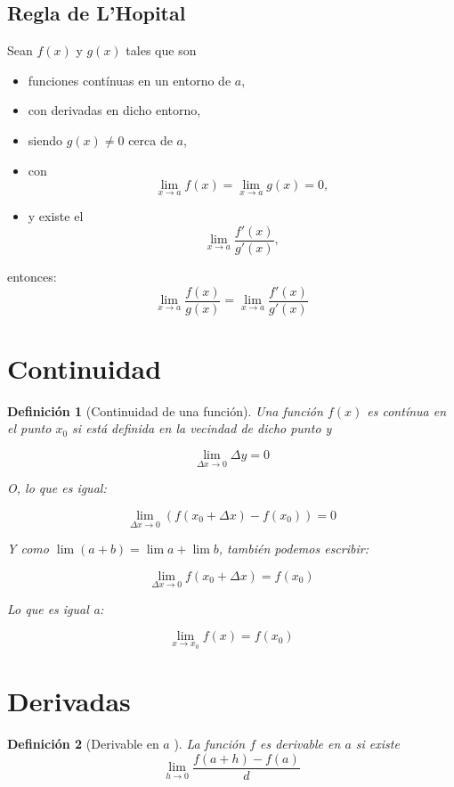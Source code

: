 \documentclass[12pt,a4paper]{extarticle}
\newtheorem{mydef}{Definici\'on}[section]
\begin{document}
\vspace{.5cm}

\subsection{Regla de L'Hopital}
\begin{minipage}{16cm}
Sean \(f(x)\) y \(g(x)\) tales que son
\begin{itemize}
\item funciones cont\'inuas en un entorno de \(a\),
\item con derivadas en dicho entorno,
\item siendo \(g(x) \neq 0\) cerca de \(a\),
\item con \[\lim_{x \to a} f(x) = \lim_{x \to a} g(x) = 0,\]
\item y existe el \[\lim_{x \to a} \frac{f'(x)}{g'(x)},\]
\end{itemize}
entonces: \[\lim_{x \to a} \frac{f(x)}{g(x)}= \lim_{x \to a} \frac{f'(x)}{g'(x)}\]
\end{minipage}
\section{Continuidad}

\begin{mydef}[Continuidad de una funci\'on]

Una funci\'on \( f(x) \) es \emph{cont\'inua} en el punto \( x_0 \) si
est\'a definida en la vecindad de dicho punto y

\[ \lim_{\Delta x \to 0} \Delta y = 0 \]

O, lo que es igual:


\[ \lim_{\Delta x \to 0} (f(x_0+\Delta x)-f(x_0)) = 0 \]

Y como \( \lim(a+b) = \lim a + \lim b \), tambi\'en podemos escribir:

\[ \lim_{\Delta x \to 0} f(x_0+ \Delta x) = f(x_0) \]

Lo que es igual a:

\[ \lim_{x \to x_0} f(x) = f(x_0) \]
\end{mydef}

\section{Derivadas}

\begin{mydef}[Derivable en \( a \) ]
La funci\'on \( f \) es \emph{derivable en} \( a \)  si existe
\[ \lim_{h \to 0} \frac{f(a+h)-f(a)}{d} \]
\end{mydef}
\end{document}
